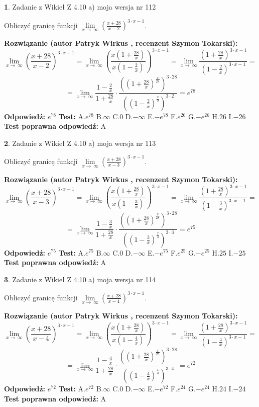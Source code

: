 \documentclass[12pt, a4paper]{article}
\theoremstyle{definition} %
\newtheorem{zad}{}
\newcommand{\zadStart}[1]{\begin{zad}#1\newline}
\newcommand{\zadStop}{\end{zad}}
\newcommand{\rozwStart}[2]{\noindent \textbf{Rozwiązanie (autor #1 , recenzent #2): }\newline}
\newcommand{\rozwStop}{\newline}
\newcommand{\odpStart}{\noindent \textbf{Odpowiedź:}\newline}
\newcommand{\odpStop}{\newline}
\newcommand{\testStart}{\noindent \textbf{Test:}\newline}
\newcommand{\testStop}{\newline}
\newcommand{\kluczStart}{\noindent \textbf{Test poprawna odpowiedź:}\newline}
\newcommand{\kluczStop}{\newline}
\begin{document}
\zadStart{Zadanie z Wikieł Z 4.10 a) moja wersja nr 112}

Obliczyć granicę funkcji  $\lim\limits_{x\to\ \infty}(\frac{x+28}{x-2})^{3\cdot x-1}$.
\zadStop
\rozwStart{Patryk Wirkus}{Szymon Tokarski}
$$\lim\limits_{x\to\ \infty}(\frac{x+28}{x-2})^{3\cdot x-1} = \lim\limits_{x\to\ \infty}(\frac{x(1+\frac{28}{x})}{x(1-\frac{2}{x})})^{3\cdot x-1}=\lim\limits_{x\to\ \infty}\frac{(1+\frac{28}{x})^{3\cdot x-1}}{(1-\frac{2}{x})^{3\cdot x-1}}=$$
$$=\lim\limits_{x\to\ \infty}\frac{1-\frac{2}{x}}{1+\frac{28}{x}}\cdot\frac{((1+\frac{28}{x})^{\frac{x}{28}})^{3\cdot28}}{((1-\frac{2}{x})^{\frac{x}{2}})^{3\cdot2}}=e^{78}$$
\rozwStop
\odpStart
$e^{78}$
\odpStop
\testStart
A.$e^{78}$ B.$\infty$ C.$0$ D.$-\infty$ E.$-e^{78}$
F.$e^{26}$ G.$-e^{26}$
H.$26$
I.$-26$
\testStop
\kluczStart
A
\kluczStop



\zadStart{Zadanie z Wikieł Z 4.10 a) moja wersja nr 113}

Obliczyć granicę funkcji  $\lim\limits_{x\to\ \infty}(\frac{x+28}{x-3})^{3\cdot x-1}$.
\zadStop
\rozwStart{Patryk Wirkus}{Szymon Tokarski}
$$\lim\limits_{x\to\ \infty}(\frac{x+28}{x-3})^{3\cdot x-1} = \lim\limits_{x\to\ \infty}(\frac{x(1+\frac{28}{x})}{x(1-\frac{3}{x})})^{3\cdot x-1}=\lim\limits_{x\to\ \infty}\frac{(1+\frac{28}{x})^{3\cdot x-1}}{(1-\frac{3}{x})^{3\cdot x-1}}=$$
$$=\lim\limits_{x\to\ \infty}\frac{1-\frac{3}{x}}{1+\frac{28}{x}}\cdot\frac{((1+\frac{28}{x})^{\frac{x}{28}})^{3\cdot28}}{((1-\frac{3}{x})^{\frac{x}{3}})^{3\cdot3}}=e^{75}$$
\rozwStop
\odpStart
$e^{75}$
\odpStop
\testStart
A.$e^{75}$ B.$\infty$ C.$0$ D.$-\infty$ E.$-e^{75}$
F.$e^{25}$ G.$-e^{25}$
H.$25$
I.$-25$
\testStop
\kluczStart
A
\kluczStop



\zadStart{Zadanie z Wikieł Z 4.10 a) moja wersja nr 114}

Obliczyć granicę funkcji  $\lim\limits_{x\to\ \infty}(\frac{x+28}{x-4})^{3\cdot x-1}$.
\zadStop
\rozwStart{Patryk Wirkus}{Szymon Tokarski}
$$\lim\limits_{x\to\ \infty}(\frac{x+28}{x-4})^{3\cdot x-1} = \lim\limits_{x\to\ \infty}(\frac{x(1+\frac{28}{x})}{x(1-\frac{4}{x})})^{3\cdot x-1}=\lim\limits_{x\to\ \infty}\frac{(1+\frac{28}{x})^{3\cdot x-1}}{(1-\frac{4}{x})^{3\cdot x-1}}=$$
$$=\lim\limits_{x\to\ \infty}\frac{1-\frac{4}{x}}{1+\frac{28}{x}}\cdot\frac{((1+\frac{28}{x})^{\frac{x}{28}})^{3\cdot28}}{((1-\frac{4}{x})^{\frac{x}{4}})^{3\cdot4}}=e^{72}$$
\rozwStop
\odpStart
$e^{72}$
\odpStop
\testStart
A.$e^{72}$ B.$\infty$ C.$0$ D.$-\infty$ E.$-e^{72}$
F.$e^{24}$ G.$-e^{24}$
H.$24$
I.$-24$
\testStop
\kluczStart
A
\kluczStop
\end{document}

